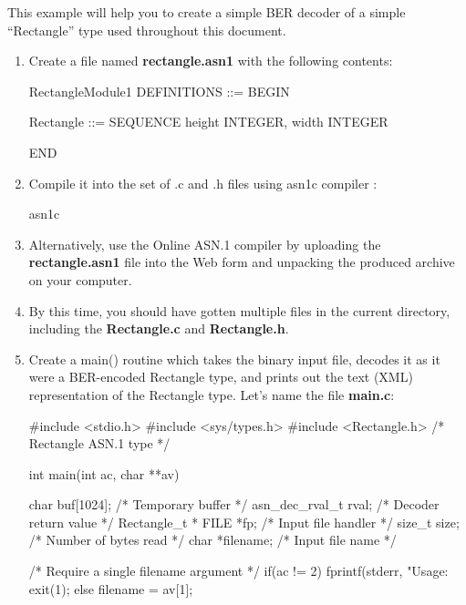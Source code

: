\documentclass[english,oneside,12pt]{book}
\begin{document}
This example will help you to create a simple BER decoder of a simple
``Rectangle'' type used throughout this document.
\begin{enumerate}
\item Create a file named \textbf{rectangle.asn1} with the following contents:

\begin{asn}
RectangleModule1 DEFINITIONS ::= BEGIN

Rectangle ::= SEQUENCE {
    height  INTEGER,
    width   INTEGER
}

END
\end{asn}
\item Compile it into the set of .c and .h files using asn1c compiler \cite{ASN1C}:

\begin{bash}
asn1c %
\end{bash}
\item Alternatively, use the Online ASN.1 compiler \cite{AONL} by uploading
the \textbf{rectangle.asn1} file into the Web form and unpacking the
produced archive on your computer.
\item By this time, you should have gotten multiple files in the current
directory, including the \textbf{Rectangle.c} and \textbf{Rectangle.h}.
\item Create a main() routine which takes the binary input file, decodes
it as it were a BER-encoded Rectangle type, and prints out the text
(XML) representation of the Rectangle type. Let's name the file \textbf{main.c}:

\begin{codesample}[basicstyle=\scriptsize\listingfont]
#include <stdio.h>
#include <sys/types.h>
#include <Rectangle.h>   /* Rectangle ASN.1 type  */

int main(int ac, char **av) {
    char buf[1024];      /* Temporary buffer      */
    asn_dec_rval_t rval; /* Decoder return value  */
    Rectangle_t *%
    FILE *fp;            /* Input file handler    */
    size_t size;         /* Number of bytes read  */
    char *filename;      /* Input file name */

    /* Require a single filename argument */
    if(ac != 2) {
        fprintf(stderr, "Usage: %
        exit(1);
    } else {
        filename = av[1];
    }

}
\end{codesample}
\end{enumerate}
\end{document}
